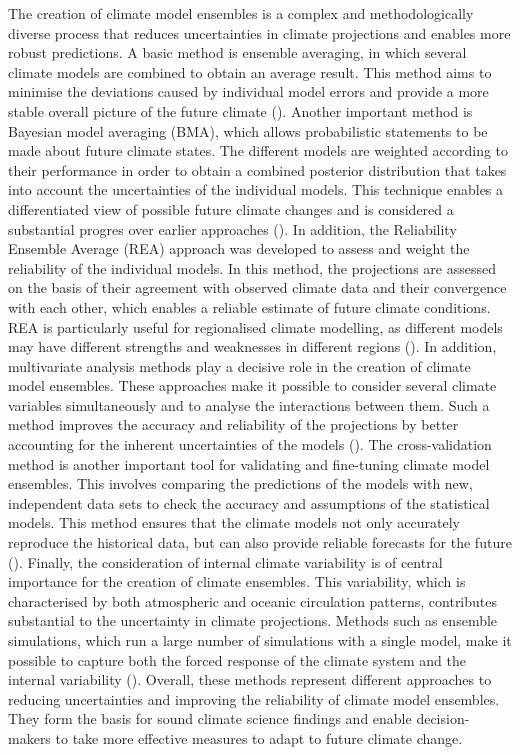 \documentclass[
]{krantz}
\begin{document}
The creation of climate model ensembles is a complex and methodologically diverse process that reduces uncertainties in climate projections and enables more robust predictions. A basic method is ensemble averaging, in which several climate models are combined to obtain an average result. This method aims to minimise the deviations caused by individual model errors and provide a more stable overall picture of the future climate (\citet{smith2009bayesian}).
Another important method is Bayesian model averaging (BMA), which allows probabilistic statements to be made about future climate states. The different models are weighted according to their performance in order to obtain a combined posterior distribution that takes into account the uncertainties of the individual models. This technique enables a differentiated view of possible future climate changes and is considered a substantial progres over earlier approaches (\citet{smith2009bayesian}).
In addition, the Reliability Ensemble Average (REA) approach was developed to assess and weight the reliability of the individual models. In this method, the projections are assessed on the basis of their agreement with observed climate data and their convergence with each other, which enables a reliable estimate of future climate conditions. REA is particularly useful for regionalised climate modelling, as different models may have different strengths and weaknesses in different regions (\citet{smith2009bayesian}).
In addition, multivariate analysis methods play a decisive role in the creation of climate model ensembles. These approaches make it possible to consider several climate variables simultaneously and to analyse the interactions between them. Such a method improves the accuracy and reliability of the projections by better accounting for the inherent uncertainties of the models (\citet{smith2009bayesian}).
The cross-validation method is another important tool for validating and fine-tuning climate model ensembles. This involves comparing the predictions of the models with new, independent data sets to check the accuracy and assumptions of the statistical models. This method ensures that the climate models not only accurately reproduce the historical data, but can also provide reliable forecasts for the future (\citet{smith2009bayesian}).
Finally, the consideration of internal climate variability is of central importance for the creation of climate ensembles. This variability, which is characterised by both atmospheric and oceanic circulation patterns, contributes substantial to the uncertainty in climate projections. Methods such as ensemble simulations, which run a large number of simulations with a single model, make it possible to capture both the forced response of the climate system and the internal variability (\citet{deser}).
Overall, these methods represent different approaches to reducing uncertainties and improving the reliability of climate model ensembles. They form the basis for sound climate science findings and enable decision-makers to take more effective measures to adapt to future climate change.
\end{document}
